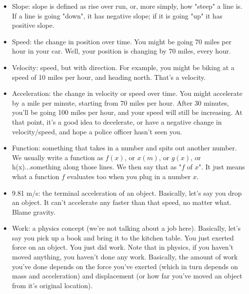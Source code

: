 \begin{itemize}
\item Slope: slope is defined as rise over run, or, more simply, how "steep" a line is. 
If a line is going "down", it has negative slope; if it is going "up" it has positive slope.
\item Speed: the change in position over time. 
You might be going 70 miles per hour in your car. 
Well, your  position is changing by 70 miles, every hour.
\item Velocity: speed, but with direction. 
For example, you might be biking at a speed of 10 miles per hour, and heading north. 
That's a velocity.
\item Acceleration: the change in velocity or speed over time. 
You might accelerate by a mile per minute, starting from 70 miles per hour. 
After 30 minutes, you'll be going 100 miles per hour, and your
speed will still be increasing. At that point, it's a good idea to
decelerate, or have a negative change in velocity/speed, and hope a
police officer hasn't seen you.
\item Function: something that takes in a number and spits out another
number. We usually write a function as $f(x)$, or $x(m)$, or $g(x)$, or
h(x)...something along those lines. We then say that as "$f$ of $x$". It
just means what a function $f$ evaluates too when you plug in a number $x$.
\item 9.81 m/s: the terminal acceleration of an object. Basically,
let's say you drop an object. It can't accelerate any faster than that
speed, no matter what. Blame gravity.
\item Work: a physics concept (we're not talking about a job here).
Basically, let's say you pick up a book and bring it to the kitchen
table. You just exerted force on an object. You just did work. Note
that in physics, if you haven't moved anything, you haven't done any
work. Basically, the amount of work you've done depends on the force
you've exerted (which in turn depends on mass and acceleration) and
displacement (or how far you've moved an object from it's original
location).
\end{itemize}
